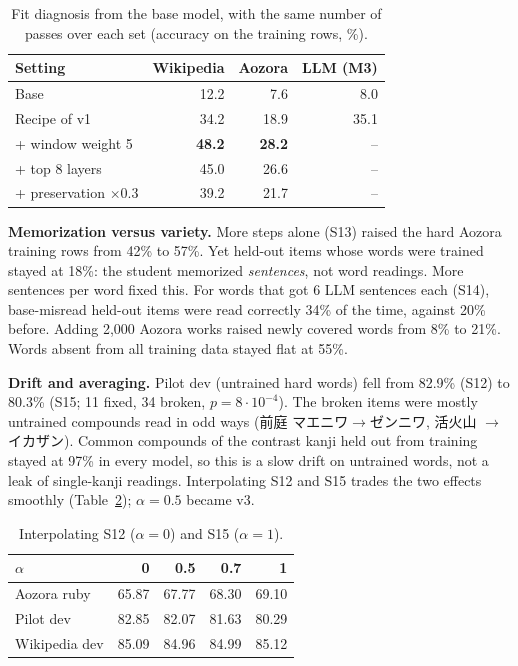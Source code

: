 \documentclass[10pt,a4paper,twocolumn]{article}
\begin{document}
\begin{table}[t]
\centering\small
\caption{Fit diagnosis from the base model, with the same number of passes over each set
(accuracy on the training rows, \%).}
\label{tab:diag}
\begin{tabular}{@{}lrrr@{}}
\toprule
Setting & Wikipedia & Aozora & LLM (M3)\\
\midrule
Base & 12.2 & 7.6 & 8.0\\
Recipe of v1 & 34.2 & 18.9 & 35.1\\
+ window weight 5 & \textbf{48.2} & \textbf{28.2} & --\\
+ top 8 layers & 45.0 & 26.6 & --\\
+ preservation $\times0.3$ & 39.2 & 21.7 & --\\
\bottomrule
\end{tabular}
\end{table}

\textbf{Memorization versus variety.}\label{sec:variety} More steps alone (S13) raised the
hard Aozora training rows from 42\% to 57\%. Yet held-out items whose words were trained stayed
at 18\%: the student memorized \emph{sentences}, not word readings. More sentences per word
fixed this. For words that got 6 LLM sentences each (S14), base-misread held-out items were
read correctly 34\% of the time, against 20\% before. Adding 2,000 Aozora works raised newly
covered words from 8\% to 21\%. Words absent from all training data stayed flat at 55\%.

\textbf{Drift and averaging.} Pilot dev (untrained hard words) fell from 82.9\% (S12) to
80.3\% (S15; 11 fixed, 34 broken, $p=8\cdot10^{-4}$). The broken items were mostly untrained
compounds read in odd ways (前庭 マエニワ$\to$ゼンニワ, 活火山 $\to$ イカザン). Common
compounds of the contrast kanji held out from training stayed at 97\% in every model, so this
is a slow drift on untrained words, not a leak of single-kanji readings. Interpolating S12 and
S15 trades the two effects smoothly (Table~\ref{tab:interp}); $\alpha=0.5$ became v3.

\begin{table}[t]
\centering\small
\caption{Interpolating S12 ($\alpha{=}0$) and S15 ($\alpha{=}1$).}
\label{tab:interp}
\begin{tabular}{@{}lrrrr@{}}
\toprule
$\alpha$ & 0 & 0.5 & 0.7 & 1\\
\midrule
Aozora ruby & 65.87 & 67.77 & 68.30 & 69.10\\
Pilot dev & 82.85 & 82.07 & 81.63 & 80.29\\
Wikipedia dev & 85.09 & 84.96 & 84.99 & 85.12\\
\bottomrule
\end{tabular}
\end{table}
\end{document}
